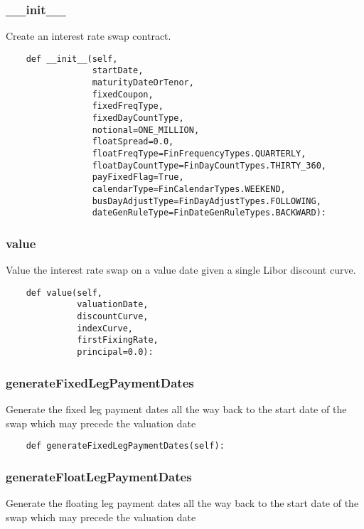 \documentclass[twoside,11pt]{book}
\begin{document}
\subsubsection*{{\bf \_\_init\_\_}}
Create an interest rate swap contract.  

\begin{lstlisting}
    def __init__(self,
                 startDate,
                 maturityDateOrTenor,
                 fixedCoupon,
                 fixedFreqType,
                 fixedDayCountType,
                 notional=ONE_MILLION,
                 floatSpread=0.0,
                 floatFreqType=FinFrequencyTypes.QUARTERLY,
                 floatDayCountType=FinDayCountTypes.THIRTY_360,
                 payFixedFlag=True,
                 calendarType=FinCalendarTypes.WEEKEND,
                 busDayAdjustType=FinDayAdjustTypes.FOLLOWING,
                 dateGenRuleType=FinDateGenRuleTypes.BACKWARD):
\end{lstlisting}

\subsubsection*{{\bf value}}
Value the interest rate swap on a value date given a single Libor discount curve.  

\begin{lstlisting}
    def value(self,
              valuationDate,
              discountCurve,
              indexCurve,
              firstFixingRate,
              principal=0.0):
\end{lstlisting}

\subsubsection*{{\bf generateFixedLegPaymentDates}}
Generate the fixed leg payment dates all the way back to the start date of the swap which may precede the valuation date 

\begin{lstlisting}
    def generateFixedLegPaymentDates(self):
\end{lstlisting}

\subsubsection*{{\bf generateFloatLegPaymentDates}}
Generate the floating leg payment dates all the way back to the start date of the swap which may precede the valuation date 
\end{document}
